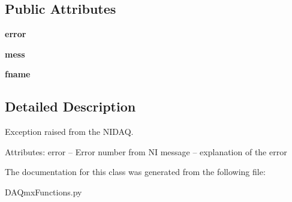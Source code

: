 \subsection*{Public Attributes}
\begin{DoxyCompactItemize}
\item 
\hypertarget{class_chassis_8git_1_1_d_a_qmx_functions_1_1_d_a_q_error_a296ea6d7206f7327920c4013a72810b8}{{\bfseries error}}\label{class_chassis_8git_1_1_d_a_qmx_functions_1_1_d_a_q_error_a296ea6d7206f7327920c4013a72810b8}

\item 
\hypertarget{class_chassis_8git_1_1_d_a_qmx_functions_1_1_d_a_q_error_a0b48632aefbfbf3e0b7a8d2767ab6d45}{{\bfseries mess}}\label{class_chassis_8git_1_1_d_a_qmx_functions_1_1_d_a_q_error_a0b48632aefbfbf3e0b7a8d2767ab6d45}

\item 
\hypertarget{class_chassis_8git_1_1_d_a_qmx_functions_1_1_d_a_q_error_a69826973a2a128c16e4075c00a99fa16}{{\bfseries fname}}\label{class_chassis_8git_1_1_d_a_qmx_functions_1_1_d_a_q_error_a69826973a2a128c16e4075c00a99fa16}

\end{DoxyCompactItemize}


\subsection{Detailed Description}
\begin{DoxyVerb}Exception raised from the NIDAQ.

Attributes:
    error -- Error number from NI
    message -- explanation of the error
\end{DoxyVerb}
 

The documentation for this class was generated from the following file\-:\begin{DoxyCompactItemize}
\item 
D\-A\-Qmx\-Functions.\-py\end{DoxyCompactItemize}
